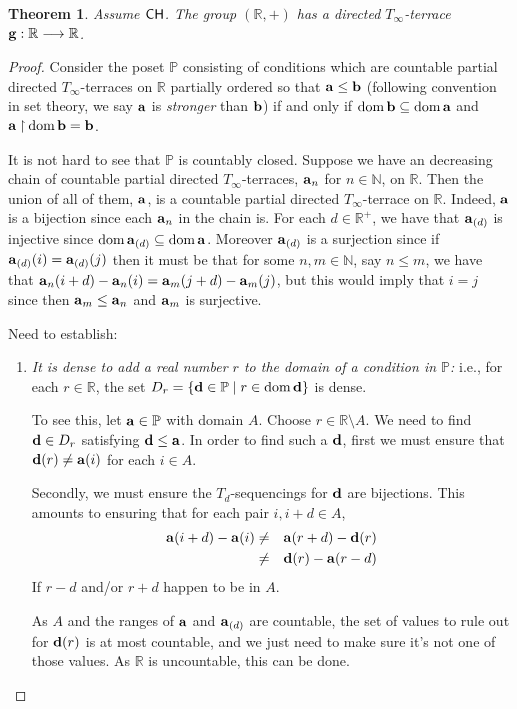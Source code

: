 \documentclass{amsart}
\newtheorem{theorem}{Theorem}
\theoremstyle{definition}
\theoremstyle{remark}
\renewcommand{\P}{\mathbb{P}}
\newcommand{\N}{\mathbb{N}}
\newcommand{\R}{\mathbb{R}}
\newcommand{\CH}{\textup{\textsf{CH}}}
\DeclareMathOperator{\dom}{dom}
\newcommand{\st}{\; | \;}
\newcommand{\set}[2]{\left\{#1\st #2 \right\}}
\newcommand{\rest}{\mathbin{\upharpoonright}}
\newcommand{\To}{\longrightarrow}
\renewcommand{\a}{\textup{\textbf{a}}}
\renewcommand{\b}{\textup{\textbf{b}}}
\newcommand{\g}{\textup{\textbf{g}}}
\renewcommand{\d}{\textup{\textbf{d}}}
\begin{document}
\begin{theorem}
Assume $\CH$. The group $(\R, +)$ has a directed $T_\infty$-terrace $\g: \R \To \R$. 
\end{theorem}
\begin{proof}
Consider the poset $\P$ consisting of conditions which are countable partial directed $T_\infty$-terraces on $\R$ partially ordered so that $\a \leq \b$ (following convention in set theory, we say $\a$ is \emph{stronger} than $\b$) if and only if $\dom \b \subseteq \dom \a$ and $\a \rest \dom \b = \b$.

It is not hard to see that $\P$ is countably closed. Suppose we have an decreasing chain of countable partial directed $T_\infty$-terraces, $\a_n$ for $n \in \N$, on $\R$. Then the union of all of them, $\a$, is a countable partial directed $T_\infty$-terrace on $\R$. Indeed, $\a$ is a bijection since each $\a_n$ in the chain is. For each $d \in \R^+$, we have that $\a_{(d)}$ is injective since $\dom\a_{(d)} \subseteq \dom\a$. Moreover $\a_{(d)}$ is a surjection since if $\a_{(d)}(i)=\a_{(d)}(j)$ then it must be that for some $n,m \in \N$, say $n\leq m$, we have that $\a_n(i+d)-\a_n(i)=\a_m(j+d)-\a_m(j)$, but this would imply that $i=j$ since then $\a_m \leq \a_n$ and $\a_m$ is surjective.

Need to establish: \begin{enumerate}

	\item \label{item:DomainDense} \emph{It is dense to add a real number $r$ to the domain of a condition in $\P$:} i.e., for each $r \in \R$, the set $D_r=\set{\d \in \P}{r \in \dom \d }$ is dense. 
	
	To see this, let $\a \in \P$ with domain $A$. Choose $r \in \R \setminus A$. We need to find $\d \in D_r$ satisfying $\d \leq \a$. In order to find such a $\d$, first we must ensure that $\d(r) \neq \a(i)$ for each $i \in A$. 
	
	Secondly, we must ensure the $T_d$-sequencings for $\d$ are bijections. This amounts to ensuring that for each pair $i, i+d \in A$, 
	\begin{eqnarray*}
		\a(i+d)-\a(i) &\neq& \a(r+d)-\d(r) \\
					&\neq& \d(r)-\a(r-d)
	\end{eqnarray*}				
	If $r-d$ and/or $r+d$ happen to be in $A$. 
	
	As $A$ and the ranges of $\a$ and $\a_{(d)}$ are countable, the set of values to rule out for $\d(r)$ is at most countable, and we just need to make sure it's not one of those values. As $\R$ is uncountable, this can be done. \\
	

\end{enumerate}
\end{proof}
\end{document}
